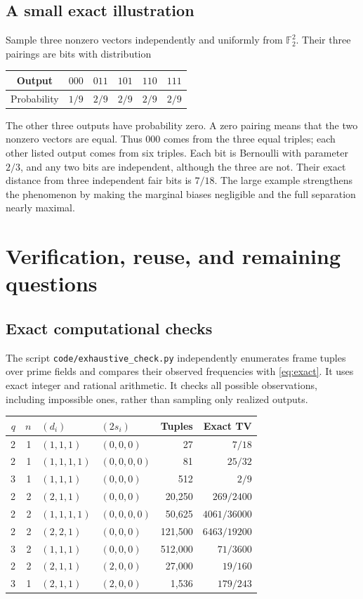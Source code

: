 \documentclass[11pt,letterpaper]{article}
\theoremstyle{definition}
\theoremstyle{remark}
\newcommand{\F}{\mathbb F}
\begin{document}
\subsection{A small exact illustration}

Sample three nonzero vectors independently and uniformly from $\F_2^2$. Their three pairings are bits with distribution
\begin{center}
\begin{tabular}{@{}cccccc@{}}
\toprule
Output & $000$ & $011$ & $101$ & $110$ & $111$\\
\midrule
Probability & $1/9$ & $2/9$ & $2/9$ & $2/9$ & $2/9$\\
\bottomrule
\end{tabular}
\end{center}
The other three outputs have probability zero. A zero pairing means that the two nonzero vectors are equal. Thus $000$ comes from the three equal triples; each other listed output comes from six triples. Each bit is Bernoulli with parameter $2/3$, and any two bits are independent, although the three are not. Their exact distance from three independent fair bits is $7/18$. The large example strengthens the phenomenon by making the marginal biases negligible and the full separation nearly maximal.

\section{Verification, reuse, and remaining questions}

\subsection{Exact computational checks}

The script \texttt{code/exhaustive\_check.py} independently enumerates frame tuples over prime fields and compares their observed frequencies with \eqref{eq:exact}. It uses exact integer and rational arithmetic. It checks all possible observations, including impossible ones, rather than sampling only realized outputs.

\begin{center}\small
\begin{tabular}{@{}rrllrr@{}}
\toprule
$q$ & $n$ & $(d_i)$ & $(2s_i)$ & Tuples & Exact TV\\
\midrule
2&1&$(1,1,1)$&$(0,0,0)$&27&$7/18$\\
2&1&$(1,1,1,1)$&$(0,0,0,0)$&81&$25/32$\\
3&1&$(1,1,1)$&$(0,0,0)$&512&$2/9$\\
2&2&$(2,1,1)$&$(0,0,0)$&20,250&$269/2400$\\
2&2&$(1,1,1,1)$&$(0,0,0,0)$&50,625&$4061/36000$\\
2&2&$(2,2,1)$&$(0,0,0)$&121,500&$6463/19200$\\
3&2&$(1,1,1)$&$(0,0,0)$&512,000&$71/3600$\\
2&2&$(2,1,1)$&$(2,0,0)$&27,000&$19/160$\\
3&1&$(2,1,1)$&$(2,0,0)$&1,536&$179/243$\\
\bottomrule
\end{tabular}
\end{center}
\end{document}
